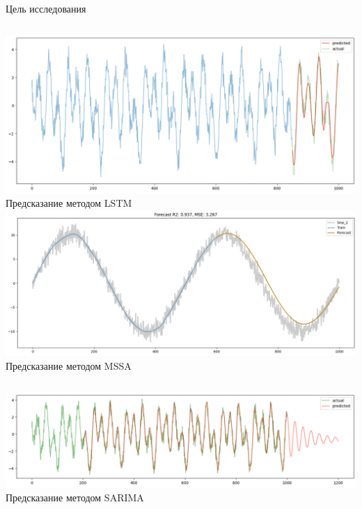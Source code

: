 \documentclass{beamer}
\begin{document}
\begin{frame}{Цель исследования}

\begin{columns}[c]
	\includegraphics[width=1.0\textwidth]{LSTM-prediction}
	Предсказание методом LSTM
	\includegraphics[width=1.0\textwidth]{MSSA-prediction}
	Предсказание методом MSSA
\end{columns}
\bigskip
\includegraphics[width=1.0\textwidth]{SARIMA-prediction}
Предсказание методом SARIMA

\end{frame}
\end{document}
